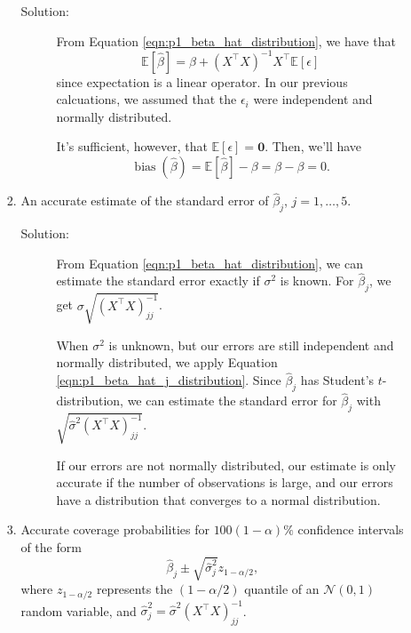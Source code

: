 \documentclass[letterpaper,11pt]{article}
\begin{document}
\begin{enumerate}
\begin{enumerate}
\begin{enumerate}
      \begin{description}
      \item[Solution:] From Equation \ref{eqn:p1_beta_hat_distribution}, we have
        that
        \begin{equation}
          \mathbb{E}\left[\hat{\beta}\right]
          =
          \beta + \left(X^\intercal X\right)^{-1}X^\intercal \mathbb{E}\left[\epsilon\right]
        \end{equation}
        since expectation is a linear operator. In our previous calcuations, we
        assumed that the $\epsilon_i$ were independent and normally distributed.

        It's sufficient, however, that
        $\boxed{\mathbb{E}\left[\epsilon\right] = \mathbf{0}.}$ Then, we'll have
        \begin{equation*}
          \operatorname{bias}\left(\hat{\beta}\right) =
          \mathbb{E}\left[\hat{\beta}\right] - \beta
          = \beta - \beta = 0.
        \end{equation*}
      \end{description}
    \item An accurate estimate of the standard error of $\hat{\beta}_j$,
      $j = 1,\ldots,5$.

      \begin{description}
      \item[Solution:] From Equation \ref{eqn:p1_beta_hat_distribution}, we can
        estimate the standard error exactly if $\sigma^2$ is known. For
        $\hat{\beta}_j$, we get $\sigma\sqrt{\left(X^\intercal X\right)_{jj}^{-1}}$.

        When $\sigma^2$ is unknown, but our errors are still independent and
        normally distributed, we apply Equation
        \ref{eqn:p1_beta_hat_j_distribution}. Since $\hat{\beta}_j$ has Student's
        $t$-distribution, we can estimate the standard error for $\hat{\beta}_j$
        with $\sqrt{\hat{\sigma}^2\left(X^\intercal X\right)_{jj}^{-1}}$.

        If our errors are not normally distributed, our estimate is only
        accurate if the number of observations is large, and our errors have a
        distribution that converges to a normal distribution.
      \end{description}
    \item Accurate coverage probabilities for $100\left(1 - \alpha\right)\%$
      confidence intervals of the form
      \begin{equation}
        \hat{\beta}_j \pm \sqrt{\hat{\sigma}_j^2}z_{1-\alpha/2},
        \label{eqn:p1_confidence_interval_normal}
      \end{equation}
      where $z_{1-\alpha/2}$ represents the $\left(1-\alpha/2\right)$ quantile
      of an $\mathcal{N}\left(0, 1\right)$ random variable, and
      $\hat{\sigma}_j^2 = \hat{\sigma}^2\left(X^\intercal X\right)_{jj}^{-1}$.


\end{enumerate}
\end{enumerate}
\end{enumerate}
\end{document}
